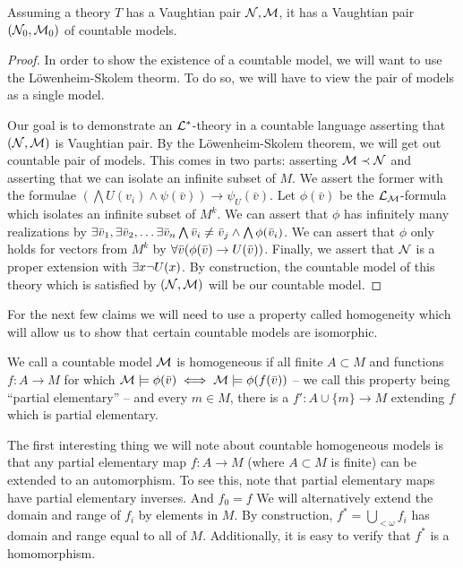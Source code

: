 \begin{theorem}\label{thm_countable_vaughtian_pairs}
Assuming a theory \(T\) has a Vaughtian pair \(\mathcal{N}, \mathcal{M}\), it has a Vaughtian pair \((\mathcal{N}_0, \mathcal{M}_0)\) of countable models. 
\end{theorem}

\begin{proof}\label{proof_countable_vaughtian_pairs}
In order to show the existence of a countable model, we will want to use the L\"owenheim-Skolem theorm.
To do so, we will have to view the pair of models as a single model. 

Our goal is to demonstrate an \(\mathcal{L}^*\)-theory in a countable language asserting that \((\mathcal{N}, \mathcal{M})\) is Vaughtian pair.
By the L\"owenheim-Skolem theorem, we will get out countable pair of models.
This comes in two parts: asserting \(\mathcal{M} \prec \mathcal{N}\) and asserting that we can isolate an infinite subset of \(M\). 
We assert the former with the formulae \((\bigwedge U(v_i) \land \psi(\bar{v})) \to \psi_U(\bar{v})\). 
Let \(\phi(\bar{v})\) be the \(\mathcal{L}_{\mathcal{M}}\)-formula which isolates an infinite subset of \(M^k\). 
We can assert that \(\phi\) has infinitely many realizations by \(\exists \bar{v}_1, \exists \bar{v}_2, \ldots \exists \bar{v}_n \bigwedge \bar{v}_i \neq \bar{v}_j \land \bigwedge \phi(\bar{v}_i)\). %
We can assert that \(\phi\) only holds for vectors from \(M^k\) by \(\forall \bar{v} (\phi(\bar{v}) \to U(\bar{v}))\).
Finally, we assert that \(\mathcal{N}\) is a proper extension with \(\exists x \neg U(x)\). 
By construction, the countable model of this theory which is satisfied by \((\mathcal{N}, \mathcal{M})\) will be our countable model.
\end{proof}

For the next few claims we will need to use a property called homogeneity which will allow us to show that certain countable models are isomorphic.

\begin{definition}\label{definition_homogeneity}
We call a countable model \(\mathcal{M}\) is homogeneous if all finite \(A \subset M\) and functions \(f: A \to M\) for which \(\mathcal{M} \models \phi(\bar{v}) \iff \mathcal{M} \models \phi(f(\bar{v}))\) -- we call this property being ``partial elementary'' -- and every \(m \in M\), there is a \(f': A \cup \{m\} \to M\) extending \(f\) which is partial elementary. %
\end{definition}

The first interesting thing we will note about countable homogeneous models is that any partial elementary map \(f: A \to M\) (where \(A \subset M\) is finite) can be extended to an automorphism. 
To see this, note that partial elementary maps have partial elementary inverses. And \(f_0 = f\) %
We will alternatively extend the domain and range of \(f_i\) by elements in \(M\). 
By construction, \(f^* = \bigcup_{<\omega}f_i\) has domain and range equal to all of \(M\). %
Additionally, it is easy to verify that \(f^*\) is a homomorphism. 

